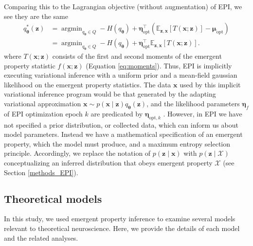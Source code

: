 \documentclass[11pt]{article}
\DeclareMathOperator*{\argmin}{argmin}
\begin{document}
Comparing this to the Lagrangian objective (without augmentation) of EPI, we see they are the same
\begin{equation}
\begin{split}
q_{\bm{\theta}}^*(\mathbf{z}) &= \argmin_{q_{\bm{\theta}} \in Q} - H(q_{\bm{\theta}}) + \bm{\eta}_{\text{opt}}^\top \left(\mathbb{E}_{\mathbf{z}, \mathbf{x}} \left[T(\mathbf{x}; \mathbf{z}) \right] - \bm{\mu}_{\text{opt}} \right) \\
 &= \argmin_{q_{\bm{\theta}} \in Q} - H(q_{\bm{\theta}}) + \bm{\eta}_{\text{opt}}^\top \mathbb{E}_{\mathbf{z}, \mathbf{x}} \left[T(\mathbf{x}; \mathbf{z}) \right].
\end{split}
\end{equation}
where $T(\mathbf{x}; \mathbf{z})$ consists of the first and second moments of the emergent property statistic $f(\mathbf{x}; \mathbf{z})$ (Equation \ref{eq:moments}).
Thus, EPI is implicitly executing variational inference with a uniform prior and a mean-field gaussian likelihood on the emergent property statistics.
The data $\mathbf{x}$ used by this implicit variational inference program would be that generated by the adapting variational approximation $\mathbf{x} \sim p(\mathbf{x} \mid \mathbf{z}) q_{\bm{\theta}}(\mathbf{z})$, and the likelihood parameters $\bm{\eta}_{f}$ of EPI optimization epoch $k$ are predicated by $\bm{\eta}_{\text{opt},k}$ .
However, in EPI we  have not specified a prior distribution, or collected data, which can inform us about model parameters.
Instead we have a mathematical specification of an emergent property, which the model must produce, and a maximum entropy selection principle.
Accordingly, we replace the notation of $p(\mathbf{z} \mid \mathbf{x})$ with $p(\mathbf{z} \mid \mathcal{X})$ conceptualizing an inferred distribution that obeys emergent property $\mathcal{X}$ (see Section \ref{methods_EPI}). 

\subsection{Theoretical models}\label{methods_theoretical_models}
In this study, we used emergent property inference to examine several models relevant to theoretical neuroscience.  
Here, we provide the details of each model  and the related analyses.
\end{document}
